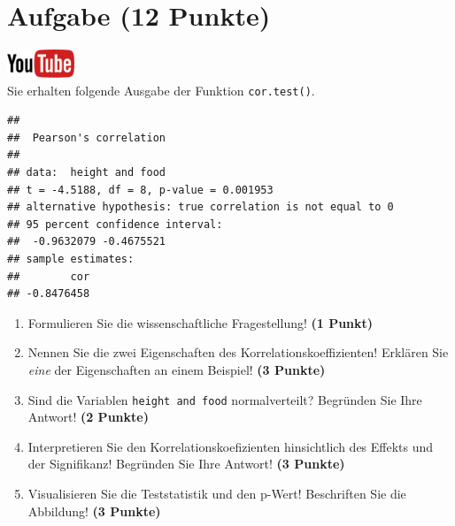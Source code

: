 \documentclass[a4paper, 9pt]{scrartcl}\usepackage[]{graphicx}\usepackage[]{xcolor}
\makeatletter
\newenvironment{kframe}{%
 \def\at@end@of@kframe{}%
 \ifinner\ifhmode%
  \def\at@end@of@kframe{\end{minipage}}%
  \begin{minipage}{\columnwidth}%
 \fi\fi%
 \def\FrameCommand##1{\hskip\@totalleftmargin \hskip-\fboxsep
 \colorbox{shadecolor}{##1}\hskip-\fboxsep
     \hskip-\linewidth \hskip-\@totalleftmargin \hskip\columnwidth}%
 \MakeFramed {\advance\hsize-\width
   \@totalleftmargin\z@ \linewidth\hsize
   \@setminipage}}%
 {\par\unskip\endMakeFramed%
 \at@end@of@kframe}
\newenvironment{knitrout}{}{} %
\makeatother
\begin{document}
 
\clearpage

\section{Aufgabe \hfill (12 Punkte)}

\hfill\href{https://youtu.be/C9skfFRTHhI}{\includegraphics[width =
   2cm]{img/youtube}}\\[1Ex]

Sie erhalten folgende \Rlogo Ausgabe der Funktion \texttt{cor.test()}.

\begin{knitrout}
\color{fgcolor}\begin{kframe}
\begin{verbatim}
## 
## 	Pearson's correlation
## 
## data:  height and food
## t = -4.5188, df = 8, p-value = 0.001953
## alternative hypothesis: true correlation is not equal to 0
## 95 percent confidence interval:
##  -0.9632079 -0.4675521
## sample estimates:
##        cor 
## -0.8476458
\end{verbatim}
\end{kframe}
\end{knitrout}


\begin{enumerate}
  \item Formulieren Sie die wissenschaftliche Fragestellung! \textbf{(1
Punkt)}
\item Nennen Sie die zwei Eigenschaften des Korrelationskoeffizienten!
  Erkl{\"a}ren Sie \textit{eine} der Eigenschaften an einem Beispiel! \textbf{(3
    Punkte)}
\item Sind die Variablen \texttt{height and food} normalverteilt?
  Begr{\"u}nden Sie Ihre Antwort! \textbf{(2 Punkte)}
\item Interpretieren Sie den Korrelationskoefizienten hinsichtlich des
  Effekts und der Signifikanz! Begr{\"u}nden Sie
  Ihre Antwort! \textbf{(3 Punkte)}
\item Visualisieren Sie die Teststatistik und den p-Wert! Beschriften Sie die Abbildung! \textbf{(3 Punkte)} 
\end{enumerate} 
\clearpage
\end{document}
